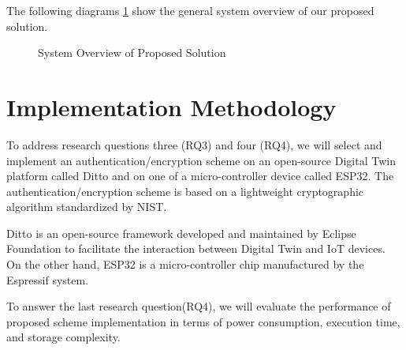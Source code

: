 The following diagrams \ref{fig:ps-archi} show the general system overview of our proposed solution. 

\begin{figure}[H]
    \centering
    
    \caption{System Overview of Proposed Solution}
    \label{fig:ps-archi}
\end{figure}







\section{Implementation Methodology}
To address research questions three (RQ3) and four (RQ4), we will select and implement an authentication/encryption scheme on
an open-source Digital Twin platform called Ditto and on one of a micro-controller device called ESP32. The authentication/encryption scheme is based on a lightweight cryptographic algorithm standardized by NIST. 

Ditto is an open-source framework developed and maintained by Eclipse Foundation to facilitate the interaction between Digital Twin and IoT devices\cite{noauthor_eclipse_nodate}. On the other hand, ESP32 is a micro-controller chip manufactured by the Espressif system. 

To answer the last research question(RQ4), we will evaluate the performance of proposed scheme implementation in terms of power consumption, execution time, and storage complexity. 

